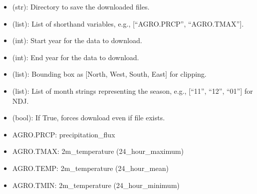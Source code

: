 \documentclass[letterpaper,10pt,english]{sphinxmanual}
\begin{document}
\sphinxAtStartPar
{}
\begin{itemize}
\item {} 
\sphinxAtStartPar
{} (str): Directory to save the downloaded files.

\item {} 
\sphinxAtStartPar
{} (list): List of shorthand variables, e.g., {[}“AGRO.PRCP”, “AGRO.TMAX”{]}.

\item {} 
\sphinxAtStartPar
{} (int): Start year for the data to download.

\item {} 
\sphinxAtStartPar
{} (int): End year for the data to download.

\item {} 
\sphinxAtStartPar
{} (list): Bounding box as {[}North, West, South, East{]} for clipping.

\item {} 
\sphinxAtStartPar
{} (list): List of month strings representing the season, e.g., {[}“11”, “12”, “01”{]} for NDJ.

\item {} 
\sphinxAtStartPar
{} (bool): If True, forces download even if file exists.

\end{itemize}

\sphinxAtStartPar
{}
\begin{itemize}
\item {} 
\sphinxAtStartPar
AGRO.PRCP: precipitation\_flux

\item {} 
\sphinxAtStartPar
AGRO.TMAX: 2m\_temperature (24\_hour\_maximum)

\item {} 
\sphinxAtStartPar
AGRO.TEMP: 2m\_temperature (24\_hour\_mean)

\item {} 
\sphinxAtStartPar
AGRO.TMIN: 2m\_temperature (24\_hour\_minimum)

\end{itemize}

\sphinxAtStartPar
{}
\end{document}
